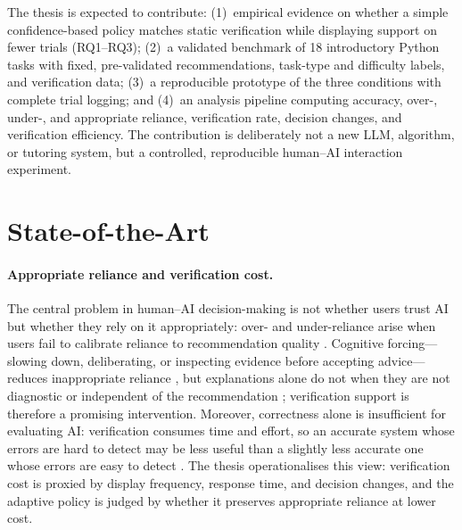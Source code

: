 \documentclass[oneside,final,14pt,a4paper]{extreport}
\begin{document}
The thesis is expected to contribute: (1)~empirical evidence on whether a
simple confidence-based policy matches static verification while displaying
support on fewer trials (RQ1--RQ3); (2)~a validated benchmark of 18
introductory Python tasks with fixed, pre-validated recommendations,
task-type and difficulty labels, and verification data; (3)~a reproducible
prototype of the three conditions with complete trial logging; and (4)~an
analysis pipeline computing accuracy, over-, under-, and appropriate
reliance, verification rate, decision changes, and verification efficiency.
The contribution is deliberately not a new LLM, algorithm, or tutoring system,
but a controlled, reproducible human--AI interaction experiment.

\section{State-of-the-Art}

\paragraph{Appropriate reliance and verification cost.}
The central problem in human--AI decision-making is not whether users trust AI
but whether they rely on it appropriately: over- and under-reliance arise when
users fail to calibrate reliance to recommendation quality
\cite{PoursabziSangdeh2021,Vasconcelos2023}. Cognitive forcing---slowing down,
deliberating, or inspecting evidence before accepting advice---reduces
inappropriate reliance \cite{Bucinca2021}, but explanations alone do not when
they are not diagnostic or independent of the recommendation
\cite{Vasconcelos2023}; verification support is therefore a promising
intervention. Moreover, correctness alone is insufficient for evaluating AI:
verification consumes time and effort, so an accurate system whose errors are
hard to detect may be less useful than a slightly less accurate one whose
errors are easy to detect \cite{VerificationCost2026}. The thesis
operationalises this view: verification cost is proxied by display frequency,
response time, and decision changes, and the adaptive policy is judged by
whether it preserves appropriate reliance at lower cost.
\end{document}

